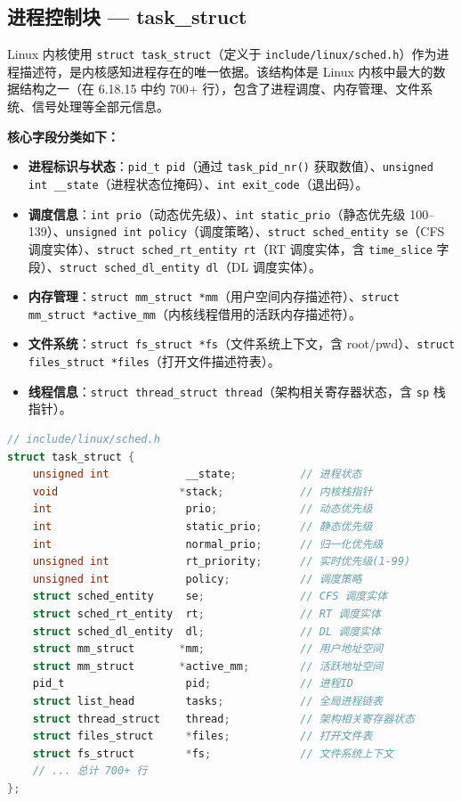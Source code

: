 \documentclass[a4paper]{article}
\begin{document}
\subsection{进程控制块 — task\_struct}

Linux 内核使用 \texttt{struct task\_struct}（定义于 \texttt{include/linux/sched.h}）作为进程描述符，是内核感知进程存在的唯一依据\cite{love,bovet}。该结构体是 Linux 内核中最大的数据结构之一（在 6.18.15 中约 700+ 行），包含了进程调度、内存管理、文件系统、信号处理等全部元信息。

\textbf{核心字段分类如下：}

\begin{itemize}[leftmargin=*]
    \item \textbf{进程标识与状态}：\texttt{pid\_t pid}（通过 \texttt{task\_pid\_nr()} 获取数值）、\texttt{unsigned int \_\_state}（进程状态位掩码）、\texttt{int exit\_code}（退出码）。
    \item \textbf{调度信息}：\texttt{int prio}（动态优先级）、\texttt{int static\_prio}（静态优先级 100–139）、\texttt{unsigned int policy}（调度策略）、\texttt{struct sched\_entity se}（CFS 调度实体）、\texttt{struct sched\_rt\_entity rt}（RT 调度实体，含 \texttt{time\_slice} 字段）、\texttt{struct sched\_dl\_entity dl}（DL 调度实体）。
    \item \textbf{内存管理}：\texttt{struct mm\_struct *mm}（用户空间内存描述符）、\texttt{struct mm\_struct *active\_mm}（内核线程借用的活跃内存描述符）。
    \item \textbf{文件系统}：\texttt{struct fs\_struct *fs}（文件系统上下文，含 root/pwd）、\texttt{struct files\_struct *files}（打开文件描述符表）。
    \item \textbf{线程信息}：\texttt{struct thread\_struct thread}（架构相关寄存器状态，含 \texttt{sp} 栈指针）。
\end{itemize}

\begin{lstlisting}[language=C, caption={task\_struct 调度相关核心字段}, label={lst:task_struct}]
// include/linux/sched.h
struct task_struct {
    unsigned int            __state;          // 进程状态
    void                   *stack;            // 内核栈指针
    int                     prio;             // 动态优先级
    int                     static_prio;      // 静态优先级
    int                     normal_prio;      // 归一化优先级
    unsigned int            rt_priority;      // 实时优先级(1-99)
    unsigned int            policy;           // 调度策略
    struct sched_entity     se;               // CFS 调度实体
    struct sched_rt_entity  rt;               // RT 调度实体
    struct sched_dl_entity  dl;               // DL 调度实体
    struct mm_struct       *mm;               // 用户地址空间
    struct mm_struct       *active_mm;        // 活跃地址空间
    pid_t                   pid;              // 进程ID
    struct list_head        tasks;            // 全局进程链表
    struct thread_struct    thread;           // 架构相关寄存器状态
    struct files_struct     *files;           // 打开文件表
    struct fs_struct        *fs;              // 文件系统上下文
    // ... 总计 700+ 行
};
\end{lstlisting}
\end{document}
